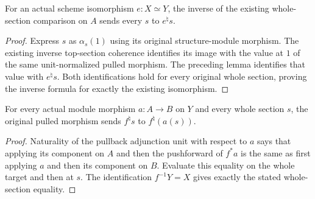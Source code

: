 \begin{lemma}
\label{lem:intrinsic-resume-whole-section-iso-inverse}
\leanok
{}
For an actual scheme isomorphism $e:X\simeq Y$, the inverse of the
existing whole-section comparison on $A$ sends every $s$ to
$e^\natural s$.
\end{lemma}
\begin{proof}
Express $s$ as $\alpha_s(1)$ using its original structure-module morphism.
The existing inverse top-section coherence identifies its image with
the value at $1$ of the same unit-normalized pulled morphism. The
preceding lemma identifies that value with $e^\natural s$. Both
identifications hold for every original whole section, proving the
inverse formula for exactly the existing isomorphism.
\end{proof}

\begin{lemma}
\label{lem:intrinsic-resume-whole-section-pullback-naturality}
\leanok
{}
For every actual module morphism $a:A\to B$ on $Y$ and every whole
section $s$, the original pulled morphism sends $f^\natural s$ to
$f^\natural(a(s))$.
\end{lemma}
\begin{proof}
Naturality of the pullback adjunction unit with respect to $a$ says
that applying its component on $A$ and then the pushforward of $f^*a$
is the same as first applying $a$ and then its component on $B$.
Evaluate this equality on the whole target and then at $s$. The
identification $f^{-1}Y=X$ gives exactly the stated whole-section equality.
\end{proof}

